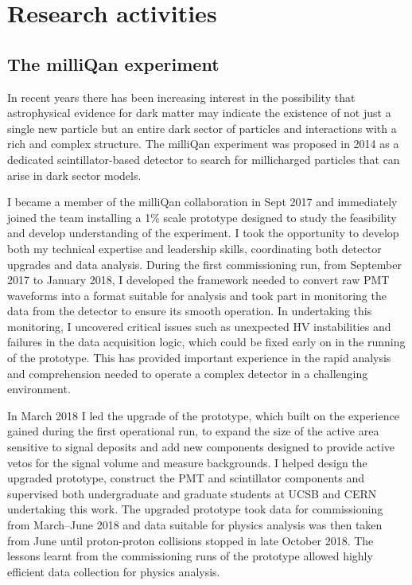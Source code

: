\documentclass[11pt]{article}
\theoremstyle{plain} \numberwithin{equation}{section}
\theoremstyle{definition}
\begin{document}
\section*{Research activities}

\subsection*{The milliQan experiment}

In recent years there has been increasing interest in the possibility 
that astrophysical evidence for dark matter may indicate the existence 
of not just a single new particle but an entire dark sector
of particles and interactions with a rich and complex structure. The milliQan experiment 
was proposed in 2014 as a dedicated scintillator-based detector to search 
for millicharged particles that can arise in dark sector models. 

I became a member of the milliQan collaboration in Sept 2017 and immediately joined the
team installing a 1\% scale prototype designed to study the feasibility and
develop understanding of the experiment. I took the opportunity to develop
both my technical expertise and leadership skills, coordinating both
detector upgrades and data analysis. During the first commissioning run, 
from September 2017 to January 2018, I developed the framework 
needed to convert raw PMT waveforms into 
a format suitable for analysis and took part in monitoring
the data from the detector to ensure its smooth operation. 
In undertaking this monitoring, I uncovered critical issues such as unexpected
HV instabilities and failures in the data acquisition logic, which 
could be fixed early on in the running of the prototype.
This has provided important
experience in the rapid analysis and comprehension needed to operate
a complex detector in a challenging environment. 

In March 2018 I led the upgrade of the prototype, which built on the experience 
gained during the first operational run, to expand the size of the active area
sensitive to signal deposits and add new components designed to provide
active vetos for the signal volume and measure backgrounds. I helped design the upgraded prototype,
construct the PMT and scintillator components and 
supervised both undergraduate and graduate students at UCSB and CERN undertaking this work.
The upgraded prototype took data for commissioning from March--June 2018 
and data suitable for physics analysis was then taken from June until 
proton-proton collisions stopped in late October 2018. 
The lessons learnt from the commissioning runs of the prototype allowed highly 
efficient data collection for physics analysis.
\end{document}
